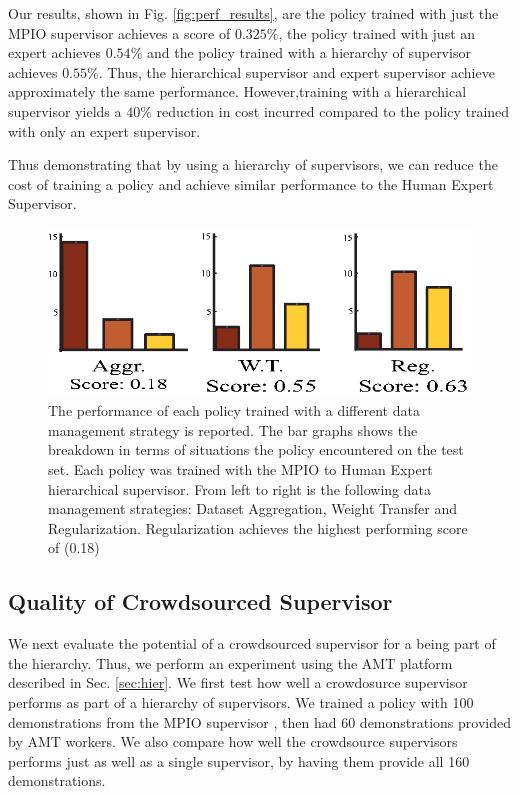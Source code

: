 \documentclass[10pt, conference]{ieeeconf}      %
\begin{document}
Our results, shown in Fig. \ref{fig:perf_results}, are the policy trained with just the MPIO supervisor achieves a score of $0.325\%$, the policy trained with just an expert achieves $0.54\%$ and the policy trained with a hierarchy of supervisor achieves $0.55\%$.  Thus, the hierarchical supervisor and expert supervisor achieve approximately the same performance. However,training with a hierarchical supervisor yields a $40\%$ reduction in cost incurred compared to the policy trained with only an expert supervisor. 


Thus demonstrating that by using a hierarchy of supervisors, we can reduce the cost of training a policy and achieve similar performance to the Human Expert Supervisor.


\begin{figure}[t]


\includegraphics{f_figs/cost_result.eps}

\caption{\footnotesize The performance of each policy trained with a different data management strategy is reported. The bar graphs shows the breakdown in terms of situations the policy encountered on the test set. Each policy was trained with the MPIO to Human Expert hierarchical supervisor. From left to right is the following data management strategies: Dataset Aggregation, Weight Transfer and Regularization. Regularization achieves the highest performing score of (0.18) }
\label{fig:cost_result}
\end{figure}

\subsection{Quality of Crowdsourced Supervisor}
We next evaluate the potential of a  crowdsourced supervisor for a being part of the hierarchy. Thus, we perform an experiment using the AMT platform described in Sec. \ref{sec:hier}. We  first test how well a crowdosurce supervisor performs as part of a hierarchy of supervisors. We trained a policy with 100  demonstrations  from the MPIO supervisor , then had 60 demonstrations provided by AMT workers. We also compare how well the crowdsource supervisors performs just as well as a single supervisor,  by having them provide all 160 demonstrations.
\end{document}

